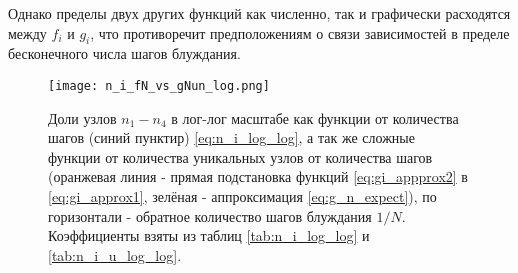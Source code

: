 Однако пределы двух других функций как численно, так и графически расходятся между $f_i$ и $g_i$, что противоречит предположениям о связи зависимостей в пределе бесконечного числа шагов блуждания.


\begin{figure}
\centering
\texttt{[image: n\_i\_fN\_vs\_gNun\_log.png]}
\label{fig:ni_fn_vs_gNun_log}
\caption{Доли узлов $n_1-n_4$ в лог-лог масштабе как функции от количества шагов (синий пунктир) \eqref{eq:n_i_log_log}, а так же сложные функции от количества уникальных узлов от количества шагов (оранжевая линия - прямая подстановка функций  \eqref{eq:gi_appprox2} в \eqref{eq:gi_approx1}, зелёная - аппроксимация \eqref{eq:g_n_expect}), по горизонтали - обратное количество шагов блуждания $1/N$. Коэффициенты взяты из таблиц \ref{tab:n_i_log_log} и \ref{tab:n_i_u_log_log}.}
\end{figure}